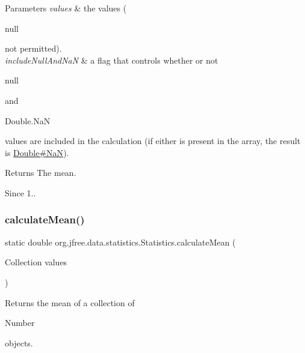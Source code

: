 \begin{DoxyParams}{Parameters}
{\em values} & the values (
\begin{DoxyCode}
null 
\end{DoxyCode}
 not permitted). \\
\hline
{\em include\+Null\+And\+NaN} & a flag that controls whether or not 
\begin{DoxyCode}
null 
\end{DoxyCode}
 and
\begin{DoxyCode}
Double.NaN 
\end{DoxyCode}
 values are included in the calculation (if either is present in the array, the result is \mbox{\hyperlink{}{Double\#\+NaN}}).\\
\hline
\end{DoxyParams}
\begin{DoxyReturn}{Returns}
The mean.
\end{DoxyReturn}
\begin{DoxySince}{Since}
1.. 
\end{DoxySince}
\mbox{\label{classorg_1_1jfree_1_1data_1_1statistics_1_1_statistics_a27d86921cd629adfb4e11cc25f31889b}} 
\subsubsection{\texorpdfstring{calculate\+Mean()}{calculateMean()}\hspace{0.1cm}{\footnotesize\ttfamily [3/4]}}
{\footnotesize\ttfamily static double org.\+jfree.\+data.\+statistics.\+Statistics.\+calculate\+Mean (\begin{DoxyParamCaption}\item[{Collection}]{values }\end{DoxyParamCaption})\hspace{0.3cm}{\ttfamily [static]}}

Returns the mean of a collection of
\begin{DoxyCode}
Number 
\end{DoxyCode}
 objects.


